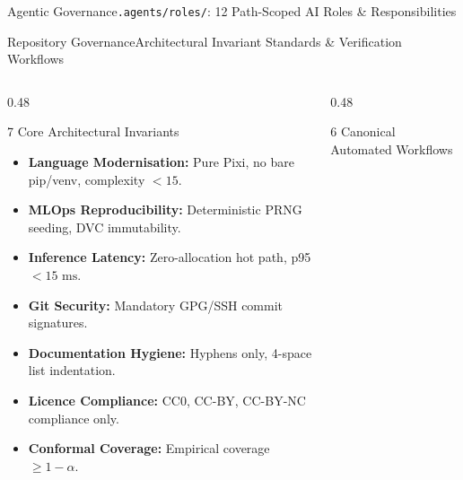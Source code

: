 \begin{frame}{Agentic Governance}{\texttt{.agents/roles/}: 12 Path-Scoped AI Roles \& Responsibilities}
\end{frame}

\begin{frame}{Repository Governance}{Architectural Invariant Standards \& Verification Workflows}
    \begin{columns}[T]
        \begin{column}{0.48\textwidth}
            \begin{block}{7 Core Architectural Invariants}
                \begin{itemize}\scriptsize
                    \item \textbf{Language Modernisation:} Pure Pixi, no bare pip/venv, complexity $< 15$.
                    \item \textbf{MLOps Reproducibility:} Deterministic PRNG seeding, DVC immutability.
                    \item \textbf{Inference Latency:} Zero-allocation hot path, p95 $< 15\text{ ms}$.
                    \item \textbf{Git Security:} Mandatory GPG/SSH commit signatures.
                    \item \textbf{Documentation Hygiene:} Hyphens only, 4-space list indentation.
                    \item \textbf{Licence Compliance:} CC0, CC-BY, CC-BY-NC compliance only.
                    \item \textbf{Conformal Coverage:} Empirical coverage $\ge 1 - \alpha$.
                \end{itemize}
            \end{block}
        \end{column}
        \begin{column}{0.48\textwidth}
            \begin{block}{6 Canonical Automated Workflows}
                \begin{itemize}\scriptsize

\end{itemize}
\end{block}
\end{column}
\end{columns}
\end{frame}
